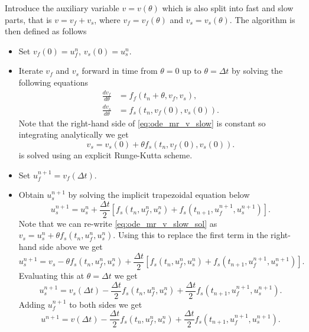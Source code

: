 \documentclass[oneside,a4paper,11pt]{report}
\begin{document}
Introduce the auxiliary variable $v=v(\theta)$ which is also split into fast and slow parts, that is $v=v_f+v_s$, where $v_f=v_f(\theta)$ and $v_s=v_s(\theta)$. The algorithm is then defined as follows
\begin{itemize}
    \item Set $v_f(0) = u^n_f$, $v_s(0) = u^n_s$.
    \item Iterate $v_f$ and $v_s$ forward in time from $\theta=0$ up to $\theta=\Delta t$ by solving the following equations
    \begin{align}
        \frac{dv_f}{d\theta} &= f_f(t_n + \theta, v_f, v_s), \label{eq:ode_mr_v_fast} \\
        \frac{dv_s}{d\theta} &= f_s(t_n, v_f(0), v_s(0)) \label{eq:ode_mr_v_slow}.
    \end{align}
    Note that the right-hand side of \cref{eq:ode_mr_v_slow} is constant so integrating analytically we get
    \begin{equation}
        \label{eq:ode_mr_v_slow_sol}
        v_s = v_s(0) + \theta f_s(t_n, v_f(0), v_s(0)) .
    \end{equation}
     is solved using an explicit Runge-Kutta scheme.
    \item Set $u^{n+1}_f = v_f(\Delta t)$.
    \item Obtain $u^{n+1}_s$ by solving the implicit trapezoidal equation below
    \begin{equation}
        u^{n+1}_s = u^n_s + \frac{\Delta t}{2} \left[ f_s(t_n, u^n_f, u^n_s) + f_s(t_{n+1}, u^{n+1}_f, u^{n+1}_s) \right].
    \end{equation}
    Note that we can re-write \cref{eq:ode_mr_v_slow_sol} as $v_s = u^n_s + \theta f_s(t_n, u^n_f, u^n_s)$. Using this to replace the first term in the right-hand side above we get
    \begin{equation}
        u^{n+1}_s = v_s - \theta f_s(t_n, u^n_f, u^n_s) + \frac{\Delta t}{2} \left[ f_s(t_n, u^n_f, u^n_s) + f_s(t_{n+1}, u^{n+1}_f, u^{n+1}_s) \right].
    \end{equation}
    Evaluating this at $\theta=\Delta t$ we get
    \begin{equation}
        u^{n+1}_s = v_s(\Delta t) - \frac{\Delta t}{2} f_s(t_n, u^n_f, u^n_s) + \frac{\Delta t}{2} f_s(t_{n+1}, u^{n+1}_f, u^{n+1}_s).
    \end{equation}
    Adding $u^{n+1}_f$ to both sides we get
    \begin{equation}
        u^{n+1} = v(\Delta t) - \frac{\Delta t}{2} f_s(t_n, u^n_f, u^n_s) + \frac{\Delta t}{2} f_s(t_{n+1}, u^{n+1}_f, u^{n+1}_s).
    \end{equation}

    
\end{itemize} 
\end{document}

